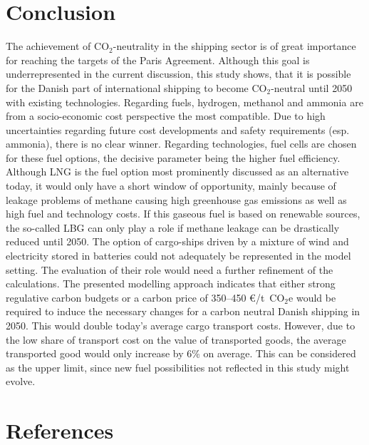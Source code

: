 \documentclass[article]{elsarticle}
\begin{document}
\section{Conclusion}
\label{sec:Conclusion}
The achievement of CO$_2$-neutrality in the shipping sector is of great importance for reaching the targets of the Paris Agreement. Although this goal is underrepresented in the current discussion, this study shows, that it is possible for the Danish part of international shipping to become CO$_2$-neutral until 2050 with existing technologies. Regarding fuels, hydrogen, methanol and ammonia are from a socio-economic cost perspective the most compatible. Due to high uncertainties regarding future cost developments and safety requirements (esp. ammonia), there is no clear winner. Regarding technologies, fuel cells are chosen for these fuel options, the decisive parameter being the higher fuel efficiency. Although LNG is the fuel option most prominently discussed as an alternative today, it would only have a short window of opportunity, mainly because of leakage problems of methane causing high greenhouse gas emissions as well as high fuel and technology costs. If this gaseous fuel is based on renewable sources, the so-called LBG can only play a role if methane leakage can be drastically reduced until 2050. The option of cargo-ships driven by a mixture of wind and electricity stored in batteries could not adequately be represented in the model setting. The evaluation of their role would need a further refinement of the calculations.
The presented modelling approach indicates that either strong regulative carbon budgets or a carbon price of 350--450 \euro/t~CO$_2$e would be required to induce the necessary changes for a carbon neutral Danish shipping in 2050. This would double today's average cargo transport costs. However, due to the low share of transport cost on the value of transported goods, the average transported good would only increase by 6\% on average. This can be considered as the upper limit, since new fuel possibilities not reflected in this study might evolve.

\section*{References}


\end{document}
